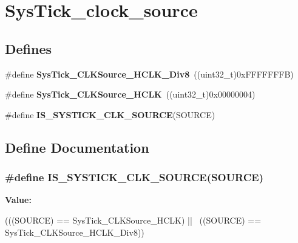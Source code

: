 \hypertarget{group__SysTick__clock__source}{
\section{SysTick\_\-clock\_\-source}
\label{group__SysTick__clock__source}
}
\subsection*{Defines}
\begin{DoxyCompactItemize}
\item 
\hypertarget{group__SysTick__clock__source_ga545c387ce43db90f15faad5f354f890d}{
\#define {\bfseries SysTick\_\-CLKSource\_\-HCLK\_\-Div8}~((uint32\_\-t)0xFFFFFFFB)}
\label{group__SysTick__clock__source_ga545c387ce43db90f15faad5f354f890d}

\item 
\hypertarget{group__SysTick__clock__source_ga8a885ce2632ad4c35e229bb7c6e60191}{
\#define {\bfseries SysTick\_\-CLKSource\_\-HCLK}~((uint32\_\-t)0x00000004)}
\label{group__SysTick__clock__source_ga8a885ce2632ad4c35e229bb7c6e60191}

\item 
\#define {\bfseries IS\_\-SYSTICK\_\-CLK\_\-SOURCE}(SOURCE)
\end{DoxyCompactItemize}


\subsection{Define Documentation}
\hypertarget{group__SysTick__clock__source_ga22d6291f6aed29442cf4cd9098fa0784}{
\subsubsection[{IS\_\-SYSTICK\_\-CLK\_\-SOURCE}]{\setlength{\rightskip}{0pt plus 5cm}\#define IS\_\-SYSTICK\_\-CLK\_\-SOURCE(SOURCE)}}
\label{group__SysTick__clock__source_ga22d6291f6aed29442cf4cd9098fa0784}
{\bfseries Value:}
\begin{DoxyCode}
(((SOURCE) == SysTick_CLKSource_HCLK) || \
                                       ((SOURCE) == SysTick_CLKSource_HCLK_Div8))
      
\end{DoxyCode}
